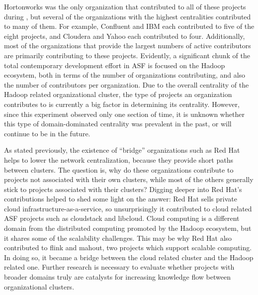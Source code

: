 Hortonworks was the only organization that contributed to all of these projects during \timeperiod, but several of the organizations with the highest centralities contributed to many of them. For example, Confluent and IBM each contributed to five of the eight projects, and Cloudera and Yahoo each contributed to four. Additionally, most of the organizations that provide the largest numbers of active contributors are primarily contributing to these projects. Evidently, a significant chunk of the total contemporary development effort in ASF is focused on the Hadoop ecosystem, both in terms of the number of organizations contributing, and also the number of contributors per organization. Due to the overall centrality of the Hadoop related organizational cluster, the type of projects an organization contributes to is currently a big factor in determining its centrality. However, since this experiment observed only one section of time, it is unknown whether this type of domain-dominated centrality was prevalent in the past, or will continue to be in the future.

As stated previously, the existence of ``bridge'' organizations such as Red Hat helps to lower the network centralization, because they provide short paths between clusters. The question is, why do these organizations contribute to projects not associated with their own clusters, while most of the others generally stick to projects associated with their clusters? Digging deeper into Red Hat's contributions helped to shed some light on the answer: Red Hat sells private cloud infrastructure-as-a-service\cite{redhat}, so unsurprisingly it contributed to cloud related ASF projects such as cloudstack and libcloud. Cloud computing is a different domain from the distributed computing promoted by the Hadoop ecosystem, but it shares some of the scalability challenges. This may be why Red Hat also contributed to flink and mahout, two projects which support scalable computing. In doing so, it became a bridge between the cloud related cluster and the Hadoop related one. Further research is necessary to evaluate whether projects with broader domains truly are catalysts for increasing knowledge flow between organizational clusters.  


